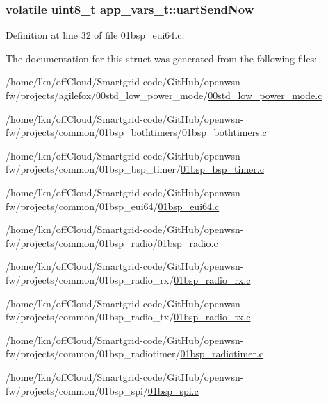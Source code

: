 \subsubsection[{\texorpdfstring{uart\+Send\+Now}{uartSendNow}}]{\setlength{\rightskip}{0pt plus 5cm}volatile {\bf uint8\+\_\+t} app\+\_\+vars\+\_\+t\+::uart\+Send\+Now}\hypertarget{structapp__vars__t_a96b871efdd04e503fbc394d1dd24bdd3}{}\label{structapp__vars__t_a96b871efdd04e503fbc394d1dd24bdd3}


Definition at line 32 of file 01bsp\+\_\+eui64.\+c.



The documentation for this struct was generated from the following files\+:\begin{DoxyCompactItemize}
\item 
/home/lkn/off\+Cloud/\+Smartgrid-\/code/\+Git\+Hub/openwsn-\/fw/projects/agilefox/00std\+\_\+low\+\_\+power\+\_\+mode/\hyperlink{agilefox_200std__low__power__mode_200std__low__power__mode_8c}{00std\+\_\+low\+\_\+power\+\_\+mode.\+c}\item 
/home/lkn/off\+Cloud/\+Smartgrid-\/code/\+Git\+Hub/openwsn-\/fw/projects/common/01bsp\+\_\+bothtimers/\hyperlink{01bsp__bothtimers_8c}{01bsp\+\_\+bothtimers.\+c}\item 
/home/lkn/off\+Cloud/\+Smartgrid-\/code/\+Git\+Hub/openwsn-\/fw/projects/common/01bsp\+\_\+bsp\+\_\+timer/\hyperlink{01bsp__bsp__timer_8c}{01bsp\+\_\+bsp\+\_\+timer.\+c}\item 
/home/lkn/off\+Cloud/\+Smartgrid-\/code/\+Git\+Hub/openwsn-\/fw/projects/common/01bsp\+\_\+eui64/\hyperlink{01bsp__eui64_8c}{01bsp\+\_\+eui64.\+c}\item 
/home/lkn/off\+Cloud/\+Smartgrid-\/code/\+Git\+Hub/openwsn-\/fw/projects/common/01bsp\+\_\+radio/\hyperlink{01bsp__radio_8c}{01bsp\+\_\+radio.\+c}\item 
/home/lkn/off\+Cloud/\+Smartgrid-\/code/\+Git\+Hub/openwsn-\/fw/projects/common/01bsp\+\_\+radio\+\_\+rx/\hyperlink{01bsp__radio__rx_8c}{01bsp\+\_\+radio\+\_\+rx.\+c}\item 
/home/lkn/off\+Cloud/\+Smartgrid-\/code/\+Git\+Hub/openwsn-\/fw/projects/common/01bsp\+\_\+radio\+\_\+tx/\hyperlink{01bsp__radio__tx_8c}{01bsp\+\_\+radio\+\_\+tx.\+c}\item 
/home/lkn/off\+Cloud/\+Smartgrid-\/code/\+Git\+Hub/openwsn-\/fw/projects/common/01bsp\+\_\+radiotimer/\hyperlink{01bsp__radiotimer_8c}{01bsp\+\_\+radiotimer.\+c}\item 
/home/lkn/off\+Cloud/\+Smartgrid-\/code/\+Git\+Hub/openwsn-\/fw/projects/common/01bsp\+\_\+spi/\hyperlink{01bsp__spi_8c}{01bsp\+\_\+spi.\+c}\item 

\end{DoxyCompactItemize}
